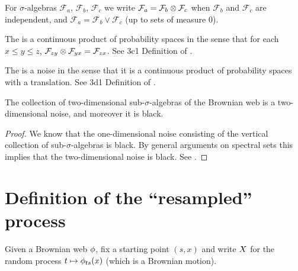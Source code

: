 {\begin{note}
  \newcommand{\F}{\mathcal{F}}

  For $\sigma$-algebras $\F_a$, $\F_b$, $\F_c$ we write $\F_a = \F_b
  \tensor \F_c$ when $\F_b$ and $\F_c$ are independent, and $\F_a =
  \F_b \vee \F_c$ (up to sets of measure $0$).
\end{note}

\begin{theorem}
  The \brownianwebnoise{}
  is a continuous product of probability spaces in the sense that
  for each $x \le y \le z$, $\mathcal{F}_{z y} \otimes \mathcal{F}_{y x} =
  \mathcal{F}_{z x}$.
  See 3c1 Definition of
  \cite{tsirelson-nonclassical-stochastic-flows}.
\end{theorem}

\begin{theorem}
  The \brownianwebnoise{} is a noise in the sense that it is a
  continuous product of probability spaces with a translation.
  See 3d1 Definition of
  \cite{tsirelson-nonclassical-stochastic-flows}.
\end{theorem}


\begin{theorem}
  The collection of two-dimensional sub-$\sigma$-algebras of the
  Brownian web is a two-dimensional noise, and moreover it is black.
\end{theorem}

\begin{proof}
  We know that the one-dimensional noise consisting of the vertical
  collection of sub-$\sigma$-algebras is black.  By general arguments
  on spectral sets this implies that the two-dimensional noise is
  black.  See \cite{tsirelson-classicality-blackness-spectrum}.
\end{proof}

\section{Definition of the ``resampled'' process}

\newcommand{\reservoir}{\mathcal{G}}

\newcommand{\twostrips}{\commafactor{\infty}{0} \tensor \commafactor{0}{-\infty}}
\newcommand{\onestrip}{\commafactor{\infty}{-\infty}}
\newcommand{\twostripsreservoir}{\twostrips \tensor \reservoir}

\begin{definition}
Given a Brownian web $\phi$, fix a starting point $(s,x)$ and write
$X$ for the random process $t \mapsto \phi_{ts}(x)$
(which is a Brownian motion).
\end{definition}

}
